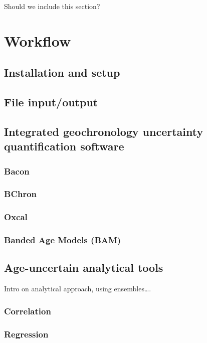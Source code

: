 \documentclass[gc, manuscript]{copernicus}
\begin{document}
Should we include this section?

\section{Workflow}

\subsection{Installation and setup}

\subsection{File input/output}

\subsection{Integrated geochronology uncertainty quantification
software}

\subsubsection{Bacon}

\subsubsection{BChron}

\subsubsection{Oxcal}

\subsubsection{Banded Age Models (BAM)}

\subsection{Age-uncertain analytical tools}

Intro on analytical approach, using ensembles\ldots{}.

\subsubsection{Correlation}

\subsubsection{Regression}
\end{document}
